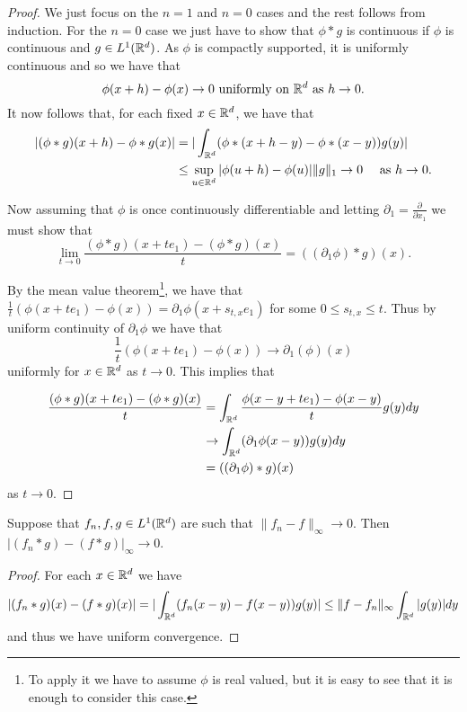 \documentclass[twoside, a4paper, 10pt]{amsart}
\begin{document}
\begin{proof} We just focus on the $n=1$ and $n=0$ cases and the rest follows from induction. For the $n=0$ case we just have to show that $\phi * g$ is continuous if $\phi$ is continuous and $g \in L^1(\mathbb{R}^d)$. As $\phi$ is compactly supported, it is uniformly continuous and so we have that $$\phi(x+h) - \phi(x) \to 0 \text{ uniformly on } \mathbb{R}^d \text{ as } h \to 0.$$ It now follows that, for each fixed $x \in \mathbb{R}^d$, we have that 
\begin{align*}|(\phi * g)(x+h) - \phi*g(x)| &= |\int_{\mathbb{R}^d} (\phi*(x+h-y) - \phi*(x-y)) g(y)|  \\
&\leq \sup_{u \in \mathbb{R}^d} |\phi(u+h) - \phi(u)| \|g\|_1 \to 0 \quad \text{ as } h \to 0.\end{align*} 

Now assuming that $\phi$ is once continuously differentiable and letting $\partial_1 = \frac{\partial}{\partial x_1}$ we must show that $$
\lim_{t \to 0} \frac{(\phi * g)(x+ te_1) - (\phi *g)(x)}{t} = ((\partial_1 \phi) * g)(x).$$

By the mean value theorem\footnote{To apply it we have to assume $\phi$ is real valued, but it is easy to see that it is enough to consider this case.}, we have that $\frac{1}{t}(\phi(x+ te_1) - \phi(x) )= \partial_1 \phi (x + s_{t,x}e_1)$ for some $0 \leq s_{t,x} \leq t$. Thus by uniform continuity of $\partial_1 \phi$ we have that $$\frac{1}{t} (\phi(x+ te_1) - \phi(x)) \to \partial_1(\phi)(x) $$ uniformly for $x \in \mathbb{R}^d$ as $t \to 0$. This implies that

\begin{align*} \frac{(\phi * g)(x+ te_1) - (\phi *g)(x)}{t} &= \int_{\mathbb{R}^d} \frac{\phi(x-y+ te_1) - \phi(x-y)}{t} g(y) dy \\ &\to \int_{\mathbb{R}^d} (\partial_1\phi(x-y)) g(y) dy \\ &= ((\partial_1 \phi) * g)(x) \end{align*} as $t \to 0$. \end{proof}

\begin{prop} Suppose that $f_n,f,g \in L^1(\mathbb{R}^d)$ are such that $\| f_n -f\|_{\infty} \to 0$. Then $|(f_n *g) - (f*g)|_{\infty} \to 0$.

\end{prop}

\begin{proof}

For each $x \in \mathbb{R}^d$ we have $$|(f_n * g) (x) - (f*g)(x)| = |\int_{\mathbb{R}^d} (f_n(x-y) - f(x-y)) g(y)| \leq \|f - f_n\|_{\infty} \int_{\mathbb{R}^d} |g(y)| dy$$ and thus we have uniform convergence. \end{proof}
\end{document}
